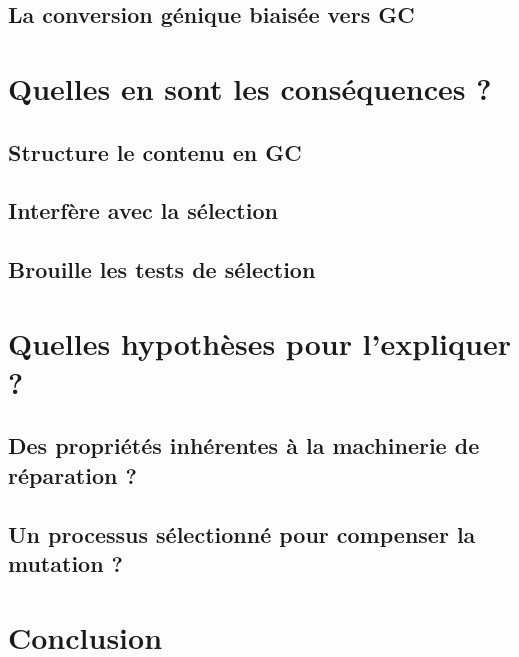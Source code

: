 \documentclass[11pt, oneside]{scrartcl}
\begin{document}
\subsection{La conversion génique biaisée vers GC}
\label{sec:orgheadline7}
\section{Quelles en sont les conséquences ?}
\label{sec:orgheadline12}
\subsection{Structure le contenu en GC}
\label{sec:orgheadline9}
\subsection{Interfère avec la sélection}
\label{sec:orgheadline10}
\subsection{Brouille les tests de sélection}
\label{sec:orgheadline11}
\section{Quelles hypothèses pour l'expliquer ?}
\label{sec:orgheadline15}
\subsection{Des propriétés inhérentes à la machinerie de réparation ?}
\label{sec:orgheadline13}
\subsection{Un processus sélectionné pour compenser la mutation ?}
\label{sec:orgheadline14}
\section*{Conclusion}
\label{sec:orgheadline16}

\end{document}
